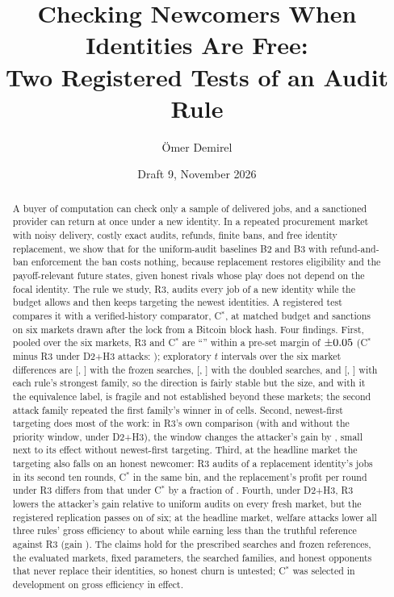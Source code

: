 \documentclass[11pt]{article}
\title{Checking Newcomers When Identities Are Free:\\Two Registered Tests of an Audit Rule}
\author{Ömer Demirel}
\date{Draft 9, November 2026}
\begin{document}
\maketitle

\begin{abstract}
A buyer of computation can check only a sample of delivered jobs, and a sanctioned provider can return at once under a new identity. In a repeated procurement market with noisy delivery, costly exact audits, refunds, finite bans, and free identity replacement, we show that for the uniform-audit baselines B2 and B3 with refund-and-ban enforcement the ban costs nothing, because replacement restores eligibility and the payoff-relevant future states, given honest rivals whose play does not depend on the focal identity. The rule we study, R3, audits every job of a new identity while the budget allows and then keeps targeting the newest identities. A registered test compares it with a verified-history comparator, C$^*$, at matched budget and sanctions on six markets drawn after the lock from a Bitcoin block hash.
Four findings. First, pooled over the six markets, R3 and C$^*$ are ``'' within a pre-set margin of $\pm0.05$ (C$^*$ minus R3 under D2+H3 attacks: ); exploratory $t$ intervals over the six market differences are [, ] with the frozen searches, [, ] with the doubled searches, and [, ] with each rule's strongest family, so the direction is fairly stable but the size, and with it the equivalence label, is fragile and not established beyond these markets; the second attack family repeated the first family's winner in  of  cells. Second, newest-first targeting does most of the work: in R3's own comparison (with and without the priority window, under D2+H3), the window changes the attacker's gain by , small next to its effect without newest-first targeting. Third, at the headline market the targeting also falls on an honest newcomer: R3 audits  of a replacement identity's jobs in its second ten rounds, C$^*$  in the same bin, and the replacement's profit per round under R3 differs from that under C$^*$ by a fraction of . Fourth, under D2+H3, R3 lowers the attacker's gain relative to uniform audits on every fresh market, but the registered replication passes on  of six; at the headline market, welfare attacks lower all three rules' gross efficiency to about  while earning less than the truthful reference against R3 (gain ).
The claims hold for the prescribed searches and frozen references, the evaluated markets, fixed parameters, the searched families, and honest opponents that never replace their identities, so honest churn is untested; C$^*$ was selected in development on gross efficiency in effect.
\end{abstract}
\end{document}
